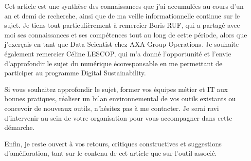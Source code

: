 Cet article est une synthèse des connaissances que j’ai accumulées au cours d’un an et demi de recherche, ainsi que de ma veille informationnelle continue sur le sujet.
Je tiens tout particulièrement à remercier Boris RUF, qui a partagé avec moi ses connaissances et ses compétences tout au long de cette période, alors que j'exerçais en tant que Data Scientist chez AXA Group Operations.
Je souhaite également remercier Céline LESCOP, qui m’a donné l’opportunité et l’envie d’approfondir le sujet du numérique écoresponsable en me permettant de participer au programme Digital Sustainability.

Si vous souhaitez approfondir le sujet, former vos équipes métier et IT aux bonnes pratiques, réaliser un bilan environnemental de vos outils existants ou concevoir de nouveaux outils, n’hésitez pas à me contacter. Je serai ravi d’intervenir au sein de votre organisation pour vous accompagner dans cette démarche.

Enfin, je reste ouvert à vos retours, critiques constructives et suggestions d’amélioration, tant sur le contenu de cet article que sur l’outil associé.
